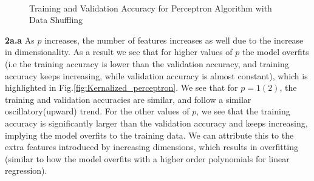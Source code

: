 \documentclass{article}
\begin{document}
\begin{figure}[H]
    \centering
    \\
\caption{Training and Validation Accuracy for Perceptron Algorithm with Data Shuffling}
    \label{fig:ShuffledPerceptron}%
\end{figure}
\newpage


\textbf{2a.a} As $p$ increases, the number of features increases as well due to the increase in dimensionality. As a result we see that for higher values of $p$ the model overfits (i.e the training accuracy is lower than the validation accuracy, and training accuracy keeps increasing, while validation accuracy is almost constant), which is highlighted in Fig.\ref{fig:Kernalized_perceptron}. We see that for $p=1(2)$, the training and validation accuracies are similar, and follow a similar oscillatory(upward) trend. For the other values of $p$, we see that the training accuracy is significantly larger than the validation accuracy and keeps increasing, implying the model overfits to the training data. We can attribute this to the extra features introduced by increasing dimensions, which results in overfitting (similar to how the model overfits with a higher order polynomials for linear regression).\\
\end{document}
